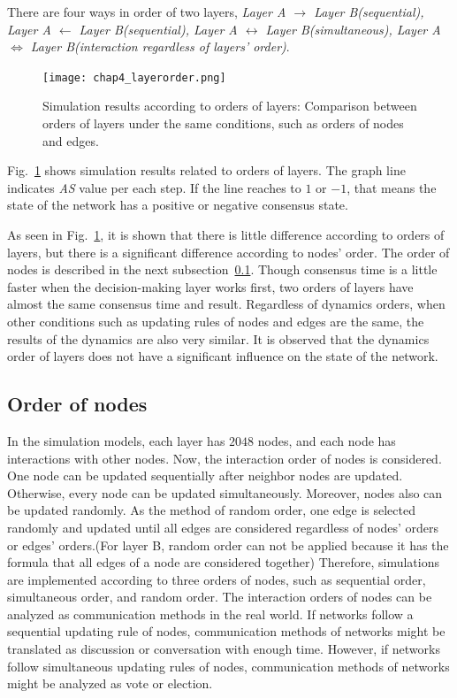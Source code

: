 There are four ways in order of two layers, \textit{Layer A $\to$ Layer B(sequential), Layer A $\leftarrow$ Layer B(sequential), Layer A $\leftrightarrow$ Layer B(simultaneous), Layer A $\Leftrightarrow$ Layer B(interaction regardless of layers' order)}. 

\begin{figure}[!htb]
	\centering
	\texttt{[image: chap4\_layerorder.png]}
	\caption{Simulation results according to orders of layers: Comparison between orders of layers under the same conditions, such as orders of nodes and edges.}
	\label{chap4_layerorder}
\end{figure}

Fig.~\ref{chap4_layerorder} shows simulation results related to orders of layers. The graph line indicates \textit{AS} value per each step. If the line reaches to $1$ or $-1$, that means the state of the network has a positive or negative consensus state.

As seen in Fig.~\ref{chap4_layerorder}, it is shown that there is little difference according to orders of layers, but there is a significant difference according to nodes' order. The order of nodes is described in the next subsection~\ref{order of node}. Though consensus time is a little faster when the decision-making layer works first, two orders of layers have almost the same consensus time and result. Regardless of dynamics orders, when other conditions such as updating rules of nodes and edges are the same, the results of the dynamics are also very similar. It is observed that the dynamics order of layers does not have a significant influence on the state of the network. \\

\subsection{Order of nodes}
\label{order of node}
In the simulation models, each layer has $2048$ nodes, and each node has interactions with other nodes. Now, the interaction order of nodes is considered. One node can be updated sequentially after neighbor nodes are updated. Otherwise, every node can be updated simultaneously. Moreover, nodes also can be updated randomly. As the method of random order, one edge is selected randomly and updated until all edges are considered regardless of nodes' orders or edges' orders.(For layer B, random order can not be applied because it has the formula that all edges of a node are considered together) Therefore, simulations are implemented according to three orders of nodes, such as sequential order, simultaneous order, and random order. The interaction orders of nodes can be analyzed as communication methods in the real world. If networks follow a sequential updating rule of nodes, communication methods of networks might be translated as discussion or conversation with enough time. However, if networks follow simultaneous updating rules of nodes, communication methods of networks might be analyzed as vote or election.

